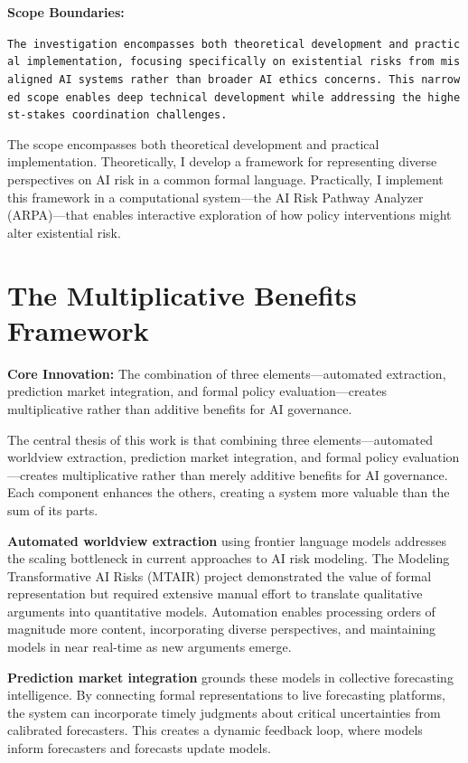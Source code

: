 \documentclass[
  11pt,
  letterpaper,
]{book}
\begin{document}
\textbf{Scope Boundaries:}

\texttt{The\ investigation\ encompasses\ both\ theoretical\ development\ and\ practical\ implementation,\ focusing\ specifically\ on\ existential\ risks\ from\ misaligned\ AI\ systems\ rather\ than\ broader\ AI\ ethics\ concerns.\ This\ narrowed\ scope\ enables\ deep\ technical\ development\ while\ addressing\ the\ highest-stakes\ coordination\ challenges.}

The scope encompasses both theoretical development and practical
implementation. Theoretically, I develop a framework for representing
diverse perspectives on AI risk in a common formal language.
Practically, I implement this framework in a computational system---the
AI Risk Pathway Analyzer (ARPA)---that enables interactive exploration
of how policy interventions might alter existential risk.

\section{The Multiplicative Benefits
Framework}\label{sec-multiplicative-benefits}

\textbf{Core Innovation:} The combination of three elements---automated
extraction, prediction market integration, and formal policy
evaluation---creates multiplicative rather than additive benefits for AI
governance.

The central thesis of this work is that combining three
elements---automated worldview extraction, prediction market
integration, and formal policy evaluation---creates multiplicative
rather than merely additive benefits for AI governance. Each component
enhances the others, creating a system more valuable than the sum of its
parts.

\textbf{Automated worldview extraction} using frontier language models
addresses the scaling bottleneck in current approaches to AI risk
modeling. The Modeling Transformative AI Risks (MTAIR) project
demonstrated the value of formal representation but required extensive
manual effort to translate qualitative arguments into quantitative
models. Automation enables processing orders of magnitude more content,
incorporating diverse perspectives, and maintaining models in near
real-time as new arguments emerge.

\textbf{Prediction market integration} grounds these models in
collective forecasting intelligence. By connecting formal
representations to live forecasting platforms, the system can
incorporate timely judgments about critical uncertainties from
calibrated forecasters. This creates a dynamic feedback loop, where
models inform forecasters and forecasts update models.
\end{document}
